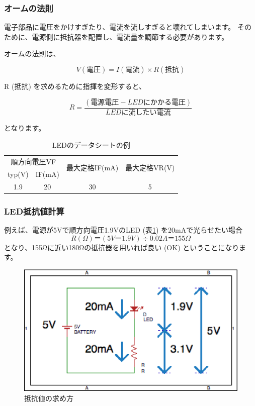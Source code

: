 \documentclass[11pt,a4paper]{jarticle}
\begin{document}
\subsubsection*{オームの法則}
電子部品に電圧をかけすぎたり、電流を流しすぎると壊れてしまいます。
そのために、電源側に抵抗器を配置し、電流量を調節する必要があります。

オームの法則は、

\begin{equation}
 V (電圧) = I (電流) \times R (抵抗)
\end{equation}

R (抵抗) を求めるために指揮を変形すると、

\begin{equation}
 R = \frac{(電源電圧 - LEDにかかる電圧)}{LEDに流したい電流}
\end{equation}

となります。

\begin{table}[htb]
 \begin{center}
 \caption{LEDのデータシートの例}
 \label{tb:dataSheet}
  \begin{tabular}{|c|c|c|c|} \hline
   \multicolumn{2}{|c|}{順方向電圧VF} & \multirow{2}{*}{最大定格IF(mA)} & \multirow{2}{*}{最大定格VR(V)} \\ \cline{1-2}
   typ(V) & IF(mA) & &\\ \hline
   1.9 & 20 & 30 & 5 \\ \hline
  \end{tabular}
 \end{center}
\end{table}

\subsubsection*{LED抵抗値計算}
例えば、電源が5Vで順方向電圧1.9VのLED (表\ref{tb:dataSheet}) を20mAで光らせたい場合
\begin{equation}
R (Ω) ＝ (5Vー1.9V) ÷ 0.02A ＝ 155Ω
\end{equation}
となり、155Ωに近い180Ωの抵抗器を用いれば良い (OK) ということになります。

\begin{figure}[htb]
  \centering
  \includegraphics[width=0.5\columnwidth]{method_for_calculating_resistance_value.eps}
  \caption{抵抗値の求め方}
  \label{figure:method_for_calculating_resistance_value}
\end{figure}
\end{document}
